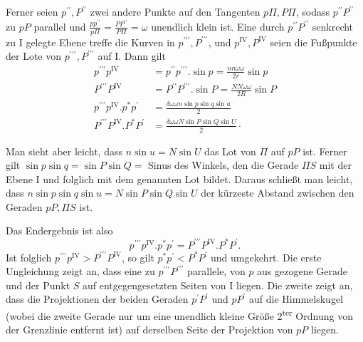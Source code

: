 Ferner seien \(p^{\prime\prime},P^{\prime\prime}\) zwei andere Punkte auf den Tangenten \(p\Pi,P\Pi\), sodass \(p^{\prime\prime}P^{\prime\prime}\) zu \(pP\) parallel und \(\frac{pp^{\prime\prime}}{p\Pi}=\frac{PP^{\prime\prime}}{P\Pi}=\omega\) unendlich klein ist. Eine durch \(p^{\prime\prime}P^{\prime\prime}\) senkrecht zu I gelegte Ebene treffe die Kurven in \(p^{\prime\prime\prime},P^{\prime\prime\prime}\), und \(p^{\mathrm{IV}},P^{\mathrm{IV}}\) seien die Fußpunkte der Lote von \(p^{\prime\prime\prime},P^{\prime\prime\prime}\) auf I. Dann gilt
\[
\begin{aligned}
p^{\prime\prime\prime}p^{\mathrm{IV}}&=p^{\prime\prime}p^{\prime\prime\prime}\mathord{.}\sin p=\frac{nn\omega\omega}{2r}\sin p\\[5pt]
P^{\prime\prime\prime}P^{\mathrm{IV}}&=P^{\prime\prime}P^{\prime\prime\prime}\mathord{.}\sin P=\frac{NN\omega\omega}{2R}\sin P\\[5pt]
p^{\prime\prime\prime}p^{\mathrm{IV}}\mathord{.}p^{*}p^{\prime}&=\frac{\delta\omega\omega n\sin p\sin q\sin u}{2}\\[5pt]
P^{\prime\prime\prime}P^{\mathrm{IV}}\mathord{.}P^{*}P^{\prime}&=\frac{\delta\omega\omega N\sin P\sin Q\sin U}{2}\mathpunct{\cdot}
\end{aligned}
\]

Man sieht aber leicht, dass \(n\sin u=N\sin U\) das Lot von \(\Pi\) auf \(pP\) ist. Ferner gilt \(\sin p\sin q=\sin P\sin Q={}\) Sinus des Winkels, den die Gerade \(\Pi S\) mit der Ebene I und folglich mit dem genannten Lot bildet. Daraus schließt man leicht, dass \(n\sin p\sin q\sin u=N\sin P\sin Q\sin U\) der kürzeste Abstand zwischen den Geraden \(pP,\Pi S\) ist.

Das Endergebnis ist also
\[
p^{\prime\prime\prime}p^{\mathrm{IV}}\mathord{.}p^{*}p^{\prime}=P^{\prime\prime\prime}P^{\mathrm{IV}}\mathord{.}P^{*}P^{\prime}.
\]
Ist folglich \(p^{\prime\prime\prime}p^{\mathrm{IV}}>P^{\prime\prime\prime}P^{\mathrm{IV}}\), so gilt \(p^{*}p^{\prime}<P^{*}P^{\prime}\) und umgekehrt. Die erste Ungleichung zeigt an, dass eine zu \(p^{\prime\prime\prime}P^{\prime\prime\prime}\) parallele, von \(p\) aus gezogene Gerade und der Punkt \(S\) auf entgegengesetzten Seiten von I liegen. Die zweite zeigt an, dass die Projektionen der beiden Geraden \(p^{\prime}P^{\prime}\) und \(pP^{\prime}\) auf die Himmelskugel (wobei die zweite Gerade nur um eine unendlich kleine Größe 2\textsuperscript{ter} Ordnung von der Grenzlinie entfernt ist) auf derselben Seite der Projektion von \(pP\) liegen.

